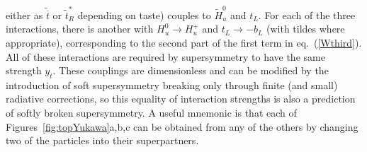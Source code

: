 \documentclass[11pt]{article}
\def\sbar{\overline}
\def\stilde{\widetilde}
\begin{document}
either as $\stilde {\sbar t}$ or $\stilde t_R^*$ depending on taste)
couples to ${\stilde H}^0_u$ and $t_L$. For each of the three
interactions, there is another with $H_u^0\rightarrow H_u^+$ and $t_L
\rightarrow -b_L$ (with tildes where appropriate), corresponding to the
second part of the first term in eq.~(\ref{Wthird}). All of these
interactions are required by supersymmetry to have the same strength
$y_t$. These couplings are dimensionless and can be modified by the
introduction of soft supersymmetry breaking only through finite (and
small) radiative corrections, so this equality of interaction strengths is
also a prediction of softly broken supersymmetry. A useful mnemonic is
that each of Figures~{\ref{fig:topYukawa}}a,b,c can be obtained from any
of the others by changing two of the particles into their superpartners. 
\end{document}
